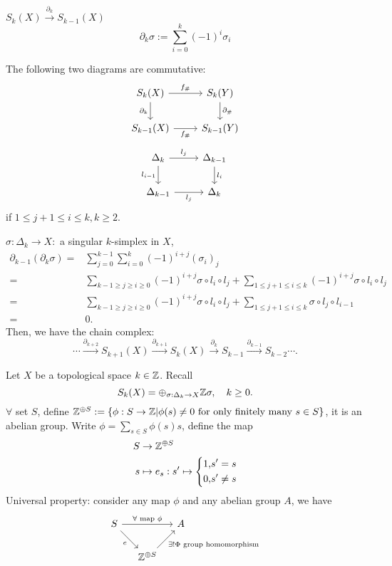 \begin{definition}
 $S_k(X)\xrightarrow{\partial_k}S_{k-1}(X)$ 
 \[
   \partial_k \sigma:=\sum_{i=0}^{k} (-1)^{i}\sigma_i
 \] 
\end{definition}
\begin{exercise}
  The following two diagrams are commutative:
  \[
  \begin{tikzcd}
    S_k(X)\arrow{r}{f_{\#}} \arrow[swap]{d}{\partial_k} &S_k(Y)\arrow{d}{\partial_{\#}} \\
    S_{k-1}(X)\arrow[swap]{r}{f_{\#}} & S_{k-1}(Y)
  \end{tikzcd}
  \]
  \[
 \begin{tikzcd}
   \Delta_k \arrow[swap]{d}{l_{i-1}} \arrow{r}{l_j}&\Delta_{k-1}\arrow{d}{l_i}\\
   \Delta_{k-1}\arrow[swap]{r}{l_j}&\Delta_{k} 
 \end{tikzcd} 
  \] 
  if $1\le j+1\le i\le k, k\ge2$.
\end{exercise}
\begin{definition}
  $\sigma:\Delta_k\to X:$ a singular $k$-simplex in $X$,
  \begin{align*}
    \partial_{k-1}\left( \partial_k\sigma \right) =&\sum_{j=0}^{k-1} \sum_{i=0}^{k} (-1)^{i+j}(\sigma_i)_j\\
    =& \sum_{k-1\ge j\ge i\ge 0}^{} (-1)^{i+j}\sigma\circ l_i\circ l_j+\sum_{1\le j+1\le i\le k}^{} (-1)^{i+j}\sigma\circ l_i\circ l_j\\
    =&\sum_{k-1\ge j\ge i\ge 0}^{} (-1)^{i+j}\sigma\circ l_i\circ l_j+\sum_{1\le j+1\le i\le k}^{} \sigma\circ l_j\circ l_{i-1}\\
    =&0
  .\end{align*}
Then, we have the chain complex:
\[
  \cdots\xrightarrow{\partial_{k+2}}S_{k+1}(X)\xrightarrow{\partial_{k+1}} S_{k}(X)\xrightarrow{\partial_k} S_{k-1}\xrightarrow{\partial_{k-1}}S_{k-2}\cdots.
\] 
\end{definition}

Let $X$ be a topological space $k\in \mathbb{Z}$. Recall
\[
  S_k(X)=\oplus_{\sigma:\Delta_k\to X}\mathbb{Z} \sigma, \quad k\ge 0.
\] 
$\forall $ set $S$, define $\mathbb{Z}^{\oplus S}:=\left\{\phi: S\to \mathbb{Z}\lvert \phi(s)\neq 0 \text{ for only finitely many }s \in S\right\} $, it is an abelian group. Write $\phi=\sum_{s\in S}^{} \phi(s) s$, define the map  
\begin{align*}
  S &\to \mathbb{Z}^{\oplus S}\\
  s &\mapsto e_s:s'\mapsto \left\{
  \begin{aligned}
    1,&s'=s\\
    0,&s'\neq s
  \end{aligned}\right.
\end{align*}
Universal property:
consider any map $\phi$ and any abelian group  $A$, we have
\[
  \begin{tikzcd}[column sep = small]
    S \arrow{rr}{\forall \text{ map }\phi} \arrow{rd}[swap]{e} & & A\\
  & \Z^{\oplus S}\arrow{ru}[swap]{\exists ! \Phi \text{ group homomorphism }} &
\end{tikzcd}
\]

